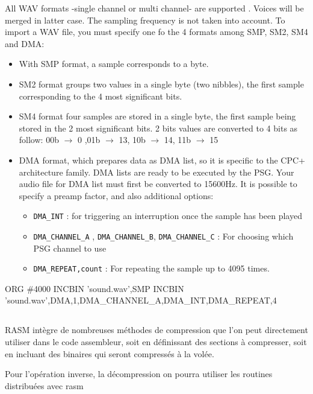 
\begin{xen}

All WAV formats -single channel or multi channel- are supported . Voices will be merged in latter case. The sampling frequency is not taken into account.  To import a WAV file, you must specify one fo the 4 formats among SMP, SM2, SM4 and DMA:
\begin{itemize}
\item With SMP format, a sample corresponds to a byte.
\item SM2 format groups two values in a single byte (two nibbles), the first sample corresponding to the 4 most significant bits.
\item SM4 format four samples are stored in a single byte, the first sample being stored in the 2 most significant bits. 2 bits values are converted to 4 bits as follow: 00b $\rightarrow$ 0 ,01b $\rightarrow$ 13, 10b $\rightarrow$ 14, 11b $\rightarrow$ 15
\item DMA format, which prepares data as DMA list, so it is specific to the CPC+ architecture family. DMA lists are ready to be executed by the PSG. Your audio file for DMA list must first be converted to 15600Hz.
It is possible to specify a preamp factor, and also additional options:
  \begin{itemize}
    \item \texttt{DMA\_INT} : for triggering an interruption once the sample has been played
    \item \texttt{DMA\_CHANNEL\_A} , \texttt{DMA\_CHANNEL\_B}, \texttt{DMA\_CHANNEL\_C} : For choosing which PSG channel to use
    \item \texttt{DMA\_REPEAT,count} : For repeating the sample up to 4095 times.
  \end{itemize}
\end{itemize}

\end{xen}

\begin{code}
ORG \#4000
INCBIN 'sound.wav',SMP
INCBIN 'sound.wav',DMA,1,DMA\_CHANNEL\_A,DMA\_INT,DMA\_REPEAT,4
\end{code}

\subsection{}

\begin{xfr}
RASM intègre de nombreuses méthodes de compression que l'on peut directement utiliser dans le code assembleur, soit en définissant des sections à compresser, soit en incluant des binaires qui seront compressés à la volée.

Pour l'opération inverse, la décompression on pourra utiliser les routines distribuées avec rasm
\end{xfr}

